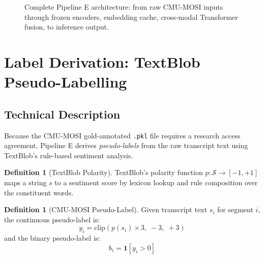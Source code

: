 \documentclass[12pt,a4paper]{article}
\theoremstyle{definition}
\newtheorem{definition}[theorem]{Definition}
\begin{document}
\begin{figure}[H]
{\begin{tikzpicture}[node distance=1.1cm and 1.4cm]
\end{tikzpicture}
}
\caption{Complete Pipeline E architecture: from raw CMU-MOSI inputs through frozen encoders, embedding cache, cross-modal Transformer fusion, to inference output.}
\label{fig:pipeline_flowchart}
\end{figure}

\section{Label Derivation: TextBlob Pseudo-Labelling}

\subsection{Technical Description}

Because the CMU-MOSI gold-annotated \texttt{.pkl} file requires a research access agreement, Pipeline E derives \emph{pseudo-labels} from the raw transcript text using TextBlob's rule-based sentiment analysis.

\begin{definition}[TextBlob Polarity]
TextBlob's polarity function $p: \mathcal{S} \to [-1, +1]$ maps a string $s$ to a sentiment score by lexicon lookup and rule composition over the constituent words.
\end{definition}

\begin{definition}[CMU-MOSI Pseudo-Label]
Given transcript text $s_i$ for segment $i$, the continuous pseudo-label is:
$$y_i = \text{clip}\!\left(p(s_i) \times 3,\; -3,\; +3\right)$$
and the binary pseudo-label is:
$$b_i = \mathbf{1}[y_i > 0]$$
\end{definition}
\end{document}
